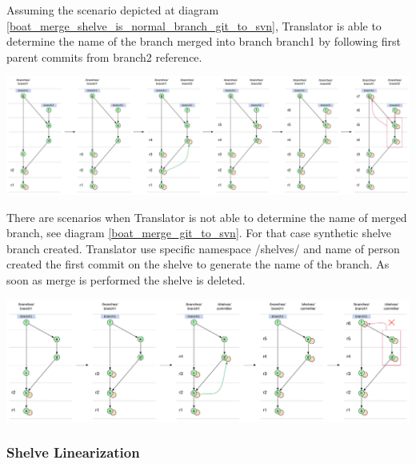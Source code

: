 Assuming the scenario depicted at diagram \ref{boat_merge_shelve_is_normal_branch_git_to_svn}, Translator is able to determine the name of the branch merged into branch branch1 by following first parent commits from branch2 reference.

\begin{center}
\includegraphics[width=\textwidth]{img/diagrams/boat_merge_shelve_is_normal_branch_git_to_svn.pdf}%
\label{boat_merge_shelve_is_normal_branch_git_to_svn}%
\end{center}

There are scenarios when Translator is not able to determine the name of merged branch, see diagram \ref{boat_merge_git_to_svn}. For that case synthetic shelve branch created. Translator use specific namespace /shelves/ and name of person created the first commit on the shelve to generate the name of the branch. As soon as merge is performed the shelve is deleted.

\begin{center}
\includegraphics[width=\textwidth]{img/diagrams/boat_merge_git_to_svn.pdf}%
\label{boat_merge_git_to_svn}%
\end{center}

\subsubsection{Shelve Linearization}

